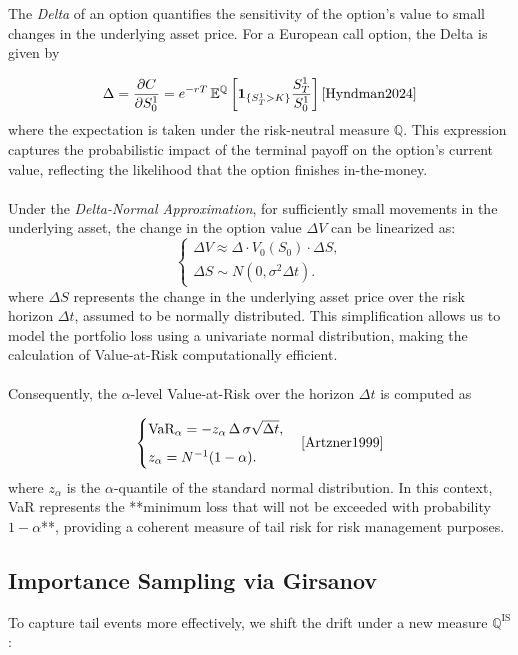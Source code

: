 \documentclass[11pt,a4paper]{article}
\begin{document}
The \textit{Delta} of an option quantifies the sensitivity of the option's value to small changes in the underlying asset price. For a European call option, the Delta is given by

\begin{equation*}
\Delta = \frac{\partial C}{\partial S_0^1} 
= e^{-rT} \, \mathbb{E}^\mathbb{Q} \left[ \mathbf{1}_{\{S_T^1>K\}} \frac{S_T^1}{S_0^1} \right]
\text{\hfill \cite{Hyndman2024}}
\end{equation*}
where the expectation is taken under the risk-neutral measure $\mathbb{Q}$. This expression captures the probabilistic impact of the terminal payoff on the option's current value, reflecting the likelihood that the option finishes in-the-money. \\
\\
Under the \textit{Delta-Normal Approximation}, for sufficiently small movements in the underlying asset, the change in the option value $\Delta V$ can be linearized as:
\begin{equation*}
\begin{cases}
\Delta V \approx \Delta \cdot V_0(S_0) \cdot \Delta S,\\[2mm]
\Delta S \sim N(0, \sigma^2 \Delta t).
\end{cases}
\end{equation*}
where $\Delta S$ represents the change in the underlying asset price over the risk horizon $\Delta t$, assumed to be normally distributed. This simplification allows us to model the portfolio loss using a univariate normal distribution, making the calculation of Value-at-Risk computationally efficient.\\
\\
Consequently, the $\alpha$-level Value-at-Risk over the horizon $\Delta t$ is computed as

\begin{equation*}
\begin{cases}
\text{VaR}_\alpha = - z_\alpha \, \Delta \, \sigma \sqrt{\Delta t},\\[2mm]
z_\alpha = N^{-1}(1-\alpha).
\end{cases}
\text{\hfill \cite{Artzner1999}}
\end{equation*}
where $z_\alpha$ is the $\alpha$-quantile of the standard normal distribution. In this context, VaR represents the **minimum loss that will not be exceeded with probability $1-\alpha$**, providing a coherent measure of tail risk for risk management purposes.


\subsection{Importance Sampling via Girsanov}
To capture tail events more effectively, we shift the drift under a new measure $\mathbb{Q}^{\text{IS}}$ \cite{Hyndman2024}:
\end{document}
